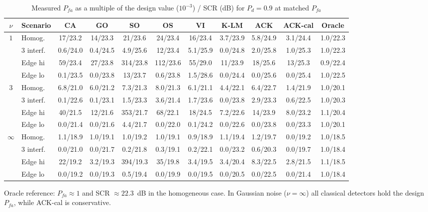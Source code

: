 \documentclass[conference]{IEEEtran}
\begin{document}
\begin{table}[!t]
\centering
\caption{Measured $P_{fa}$ as a multiple of the design value ($10^{-3}$) / SCR (dB) for $P_d=0.9$ at matched $P_{fa}$}
\label{tab:res}
\scriptsize
\setlength{\tabcolsep}{3.6pt}
\begin{tabular}{@{}cl*{9}{c}@{}}
\toprule
$\nu$ & Scenario & CA & GO & SO & OS & VI & K-LM & ACK & ACK-cal & Oracle \\
\midrule
$1$ & Homog. & 17/23.2 & 14/23.3 & 21/23.6 & 24/23.4 & 16/23.4 & 3.7/23.9 & 5.8/24.9 & 3.1/24.4 & 1.0/22.3 \\
 & 3 interf. & 0.6/24.0 & 0.4/24.5 & 4.9/25.6 & 12/23.4 & 5.1/25.9 & 0.0/24.8 & 2.0/25.8 & 1.0/25.3 & 1.0/22.3 \\
 & Edge hi & 59/23.4 & 27/23.8 & 314/23.8 & 112/23.6 & 55/29.0 & 11/23.9 & 18/25.6 & 13/25.3 & 0.9/22.4 \\
 & Edge lo & 0.1/23.5 & 0.0/23.8 & 13/23.7 & 0.6/23.8 & 1.5/28.6 & 0.0/24.4 & 0.0/25.6 & 0.0/25.4 & 1.0/22.5 \\
\midrule
$3$ & Homog. & 6.8/21.0 & 6.0/21.2 & 7.3/21.3 & 8.0/21.3 & 6.1/21.1 & 4.4/22.1 & 6.4/22.7 & 1.4/21.9 & 1.0/20.1 \\
 & 3 interf. & 0.1/22.6 & 0.1/23.1 & 1.5/23.3 & 3.6/21.4 & 1.7/23.6 & 0.0/23.8 & 2.9/23.3 & 0.6/22.5 & 1.0/20.3 \\
 & Edge hi & 40/21.5 & 12/21.6 & 353/21.7 & 68/22.1 & 18/24.5 & 7.2/22.6 & 14/23.9 & 8.0/23.2 & 1.1/20.4 \\
 & Edge lo & 0.0/21.4 & 0.0/21.6 & 4.4/21.7 & 0.0/22.0 & 0.1/24.2 & 0.0/22.6 & 0.0/23.8 & 0.0/23.3 & 1.0/20.1 \\
\midrule
$\infty$ & Homog. & 1.1/18.9 & 1.0/19.1 & 1.0/19.2 & 1.0/19.1 & 0.9/18.9 & 1.1/19.4 & 1.2/19.7 & 0.0/19.2 & 1.0/18.5 \\
 & 3 interf. & 0.0/21.0 & 0.0/21.7 & 0.2/21.8 & 0.3/19.1 & 0.2/22.1 & 0.0/23.2 & 0.6/20.3 & 0.0/19.7 & 1.0/18.4 \\
 & Edge hi & 22/19.2 & 3.2/19.3 & 394/19.3 & 35/19.8 & 3.4/19.5 & 3.4/20.4 & 8.3/22.5 & 2.8/21.5 & 1.1/18.5 \\
 & Edge lo & 0.0/19.2 & 0.0/19.3 & 0.5/19.4 & 0.0/19.9 & 0.0/19.5 & 0.0/20.5 & 0.0/22.5 & 0.0/21.4 & 1.0/18.4 \\
\bottomrule
\end{tabular}
\end{table}

\noindent Oracle reference: $P_{fa}\approx1$ and SCR $\approx22.3$~dB in the homogeneous case. In Gaussian noise ($\nu=\infty$) all classical detectors hold the design $P_{fa}$, while ACK-cal is conservative.
\end{document}
